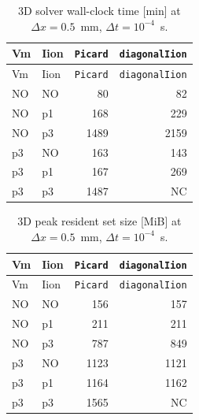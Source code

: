 \documentclass[11pt,a4paper]{article}
\newcommand{\code}[1]{\texttt{\small #1}}
\begin{document}
\begin{center}\footnotesize
\begin{longtable}{llrr}
\caption{3D solver wall-clock time [min] at $\Delta x = 0.5$~mm,
$\Delta t = 10^{-4}$~s.}\\
\toprule
Vm & Iion & \code{Picard} & \code{diagonalIion} \\
\midrule\endfirsthead\toprule
Vm & Iion & \code{Picard} & \code{diagonalIion} \\
\midrule\endhead
NO & NO &   80 &   82 \\
NO & p1 &  168 &  229 \\
NO & p3 & 1489 & 2159 \\
p3 & NO &  163 &  143 \\
p3 & p1 &  167 &  269 \\
p3 & p3 & 1487 & NC   \\
\bottomrule\end{longtable}\end{center}

\begin{center}\footnotesize
\begin{longtable}{llrr}
\caption{3D peak resident set size [MiB] at $\Delta x = 0.5$~mm,
$\Delta t = 10^{-4}$~s.}\\
\toprule
Vm & Iion & \code{Picard} & \code{diagonalIion} \\
\midrule\endfirsthead\toprule
Vm & Iion & \code{Picard} & \code{diagonalIion} \\
\midrule\endhead
NO & NO &  156 &  157 \\
NO & p1 &  211 &  211 \\
NO & p3 &  787 &  849 \\
p3 & NO & 1123 & 1121 \\
p3 & p1 & 1164 & 1162 \\
p3 & p3 & 1565 & NC   \\
\bottomrule\end{longtable}\end{center}
\end{document}
